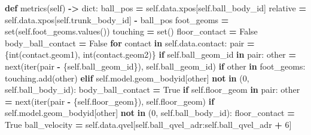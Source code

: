 \documentclass[
  chinese,
  11pt,
  letterpaper,
]{article}
\newenvironment{Shaded}{\begin{snugshade}}{\end{snugshade}}
\newcommand{\BuiltInTok}[1]{#1}
\newcommand{\ControlFlowTok}[1]{\textcolor[rgb]{0.13,0.29,0.53}{\textbf{#1}}}
\newcommand{\DecValTok}[1]{\textcolor[rgb]{0.00,0.00,0.81}{#1}}
\newcommand{\KeywordTok}[1]{\textcolor[rgb]{0.13,0.29,0.53}{\textbf{#1}}}
\newcommand{\NormalTok}[1]{#1}
\newcommand{\OperatorTok}[1]{\textcolor[rgb]{0.81,0.36,0.00}{\textbf{#1}}}
\newcommand{\VariableTok}[1]{\textcolor[rgb]{0.00,0.00,0.00}{#1}}
\renewenvironment{Shaded}{\par\smallskip}{\par\smallskip}
\begin{document}
\begin{Shaded}
\begin{Highlighting}[]
    \KeywordTok{def}\NormalTok{ metrics(}\VariableTok{self}\NormalTok{) }\OperatorTok{{-}\textgreater{}} \BuiltInTok{dict}\NormalTok{:}
\NormalTok{        ball\_pos }\OperatorTok{=} \VariableTok{self}\NormalTok{.data.xpos[}\VariableTok{self}\NormalTok{.ball\_body\_id]}
\NormalTok{        relative }\OperatorTok{=} \VariableTok{self}\NormalTok{.data.xpos[}\VariableTok{self}\NormalTok{.trunk\_body\_id] }\OperatorTok{{-}}\NormalTok{ ball\_pos}
\NormalTok{        foot\_geoms }\OperatorTok{=} \BuiltInTok{set}\NormalTok{(}\VariableTok{self}\NormalTok{.foot\_geoms.values())}
\NormalTok{        touching }\OperatorTok{=} \BuiltInTok{set}\NormalTok{()}
\NormalTok{        floor\_contact }\OperatorTok{=} \VariableTok{False}
\NormalTok{        body\_ball\_contact }\OperatorTok{=} \VariableTok{False}
        \ControlFlowTok{for}\NormalTok{ contact }\KeywordTok{in} \VariableTok{self}\NormalTok{.data.contact:}
\NormalTok{            pair }\OperatorTok{=}\NormalTok{ \{}\BuiltInTok{int}\NormalTok{(contact.geom1), }\BuiltInTok{int}\NormalTok{(contact.geom2)\}}
            \ControlFlowTok{if} \VariableTok{self}\NormalTok{.ball\_geom\_id }\KeywordTok{in}\NormalTok{ pair:}
\NormalTok{                other }\OperatorTok{=} \BuiltInTok{next}\NormalTok{(}\BuiltInTok{iter}\NormalTok{(pair }\OperatorTok{{-}}\NormalTok{ \{}\VariableTok{self}\NormalTok{.ball\_geom\_id\}), }\VariableTok{self}\NormalTok{.ball\_geom\_id)}
                \ControlFlowTok{if}\NormalTok{ other }\KeywordTok{in}\NormalTok{ foot\_geoms:}
\NormalTok{                    touching.add(other)}
                \ControlFlowTok{elif} \VariableTok{self}\NormalTok{.model.geom\_bodyid[other] }\KeywordTok{not} \KeywordTok{in}\NormalTok{ (}\DecValTok{0}\NormalTok{, }\VariableTok{self}\NormalTok{.ball\_body\_id):}
\NormalTok{                    body\_ball\_contact }\OperatorTok{=} \VariableTok{True}
            \ControlFlowTok{if} \VariableTok{self}\NormalTok{.floor\_geom }\KeywordTok{in}\NormalTok{ pair:}
\NormalTok{                other }\OperatorTok{=} \BuiltInTok{next}\NormalTok{(}\BuiltInTok{iter}\NormalTok{(pair }\OperatorTok{{-}}\NormalTok{ \{}\VariableTok{self}\NormalTok{.floor\_geom\}), }\VariableTok{self}\NormalTok{.floor\_geom)}
                \ControlFlowTok{if} \VariableTok{self}\NormalTok{.model.geom\_bodyid[other] }\KeywordTok{not} \KeywordTok{in}\NormalTok{ (}\DecValTok{0}\NormalTok{, }\VariableTok{self}\NormalTok{.ball\_body\_id):}
\NormalTok{                    floor\_contact }\OperatorTok{=} \VariableTok{True}
\NormalTok{        ball\_velocity }\OperatorTok{=} \VariableTok{self}\NormalTok{.data.qvel[}\VariableTok{self}\NormalTok{.ball\_qvel\_adr:}\VariableTok{self}\NormalTok{.ball\_qvel\_adr }\OperatorTok{+} \DecValTok{6}\NormalTok{]}

\end{Highlighting}
\end{Shaded}
\end{document}
